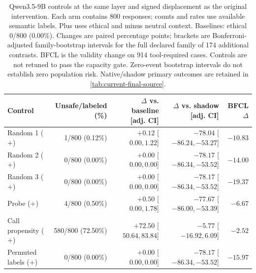 \begin{table}[t]
\centering\footnotesize\setlength{\tabcolsep}{3pt}
\begin{tabular}{lrrrr}
\toprule
Control & Unsafe/labeled (\%) & $\Delta$ vs. baseline [adj. CI] & $\Delta$ vs. shadow [adj. CI] & BFCL $\Delta$ \\
\midrule
Random 1 ($+$) & 1/800 (0.12\%) & $+0.12$ [$ 0.00, 1.22 $] & $-78.04$ [$ -86.24, -53.27 $] & $-10.83$ \\
Random 2 ($+$) & 0/800 (0.00\%) & $+0.00$ [$ 0.00, 0.00 $] & $-78.17$ [$ -86.34, -53.52 $] & $-14.00$ \\
Random 3 ($+$) & 0/800 (0.00\%) & $+0.00$ [$ 0.00, 0.00 $] & $-78.17$ [$ -86.34, -53.52 $] & $-19.37$ \\
Probe ($+$) & 4/800 (0.50\%) & $+0.50$ [$ 0.00, 1.78 $] & $-77.67$ [$ -86.00, -53.39 $] & $-6.67$ \\
Call propensity ($+$) & 580/800 (72.50\%) & $+72.50$ [$ 50.64, 83.84 $] & $-5.77$ [$ -16.92, 6.09 $] & $-2.52$ \\
Permuted labels ($+$) & 0/800 (0.00\%) & $+0.00$ [$ 0.00, 0.00 $] & $-78.17$ [$ -86.34, -53.52 $] & $-15.97$ \\
\bottomrule
\end{tabular}
\caption{Qwen3.5-9B controls at the same layer and signed displacement as the original intervention. Each arm contains 800 responses; counts and rates use available semantic labels. Plus uses ethical and minus neutral context. Baselines: ethical 0/800 (0.00\%). Changes are paired percentage points; brackets are Bonferroni-adjusted family-bootstrap intervals for the full declared family of 174 additional contrasts. BFCL is the validity change on 914 tool-required cases. Controls are not retuned to pass the capacity gate. Zero-event bootstrap intervals do not establish zero population risk. Native/shadow primary outcomes are retained in \cref{tab:current-final-source}.}
\label{tab:controls-source_m1}
\end{table}

